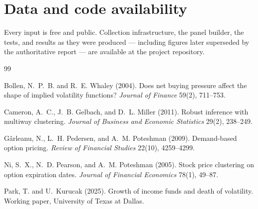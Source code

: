 \documentclass[11pt]{article}
\begin{document}
\section*{Data and code availability}

Every input is free and public. Collection infrastructure, the panel builder, the
tests, and results as they were produced --- including figures later superseded by the
authoritative report --- are available at the project repository.

\begin{thebibliography}{99}

Bollen, N.~P.~B. and R.~E. Whaley (2004).
Does net buying pressure affect the shape of implied volatility functions?
\emph{Journal of Finance} 59(2), 711--753.

Cameron, A.~C., J.~B. Gelbach, and D.~L. Miller (2011).
Robust inference with multiway clustering.
\emph{Journal of Business and Economic Statistics} 29(2), 238--249.

G\^{a}rleanu, N., L.~H. Pedersen, and A.~M. Poteshman (2009).
Demand-based option pricing.
\emph{Review of Financial Studies} 22(10), 4259--4299.

Ni, S.~X., N.~D. Pearson, and A.~M. Poteshman (2005).
Stock price clustering on option expiration dates.
\emph{Journal of Financial Economics} 78(1), 49--87.

Park, T. and U.~Kurucak (2025).
Growth of income funds and death of volatility.
Working paper, University of Texas at Dallas.

\end{thebibliography}
\end{document}
